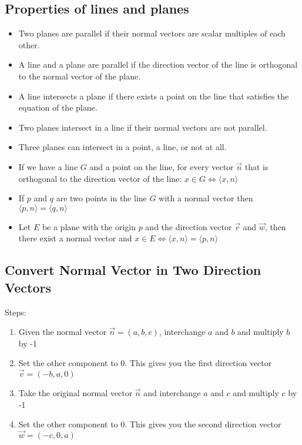 \subsection{Properties of lines and planes}

\begin{itemize}

	\item Two planes are parallel if their normal vectors are scalar multiples of each other.

	\item A line and a plane are parallel if the direction vector of the line is orthogonal to the normal vector of the plane.

	\item A line intersects a plane if there exists a point on the line that satisfies the equation of the plane.

	\item Two planes intersect in a line if their normal vectors are not parallel.

	\item Three planes can intersect in a point, a line, or not at all.

	\item If we have a line \(G\) and a point on the line, for every vector \(\vec{n}\) that is orthogonal to the
 	      direction vector of the line: \(x \in G \iff \langle x, n \rangle\)

	\item If \(p\) and \(q\) are two points in the line \(G\) with a normal vector then \(\langle p, n\rangle = \langle q, n\rangle\)

	\item Let \(E\) be a plane with the origin \(p\) and the direction vector \(\vec{v}\) and \(\vec{w}\), then there exist a normal vector and
	      \(x \in E \iff \langle x, n\rangle = \langle p, n \rangle\)

\end{itemize}

\subsection{Convert Normal Vector in Two Direction Vectors}

Steps:

\begin{enumerate}
	
	\item Given the normal vector \(\vec{n} = (a, b, c)\), interchange \(a\) and \(b\) and multiply \(b\) by -1
	
	\item Set the other component to 0. This gives you the first direction vector \(\vec{v} = (-b, a, 0)\)
	
	\item Take the original normal vector \(\vec{n}\) and interchange \(a\) and \(c\) and multiply \(c\) by -1
	
	\item Set the other component to 0. This gives you the second direction vector \(\vec{w} = (-c, 0, a)\)

\end{enumerate}

